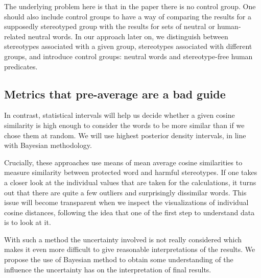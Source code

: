 \documentclass[
  10pt,
  dvipsnames,enabledeprecatedfontcommands]{scrartcl}
\begin{document}
The underlying problem here is that in the paper there is no control
group. One should also include control groups to have a way of comparing
the results for a supposedly stereotyped group with the results for sets
of neutral or human-related neutral words. In our approach later on, we
distinguish between stereotypes associated with a given group,
stereotypes associated with different groups, and introduce control
groups: neutral words and stereotype-free human predicates.




\hypertarget{metrics-that-pre-average-are-a-bad-guide}{%
\subsection{Metrics that pre-average are a bad
guide}\label{metrics-that-pre-average-are-a-bad-guide}}

In contrast, statistical intervals will help us decide whether a given
cosine similarity is high enough to consider the words to be more
similar than if we chose them at random. We will use highest posterior
density intervals, in line with Bayesian methodology.

Crucially, these approaches use means of mean average cosine
similarities to measure similarity between protected word and harmful
stereotypes. If one takes a closer look at the individual values that
are taken for the calculations, it turns out that there are quite a few
outliers and surprisingly dissimilar words. This issue will become
transparent when we inspect the visualizations of individual cosine
distances, following the idea that one of the first step to understand
data is to look at it.

With such a method the uncertainty involved is not really considered
which makes it even more difficult to give reasonable interpretations of
the results. We propose the use of Bayesian method to obtain some
understanding of the influence the uncertainty has on the interpretation
of final results.


\end{document}
